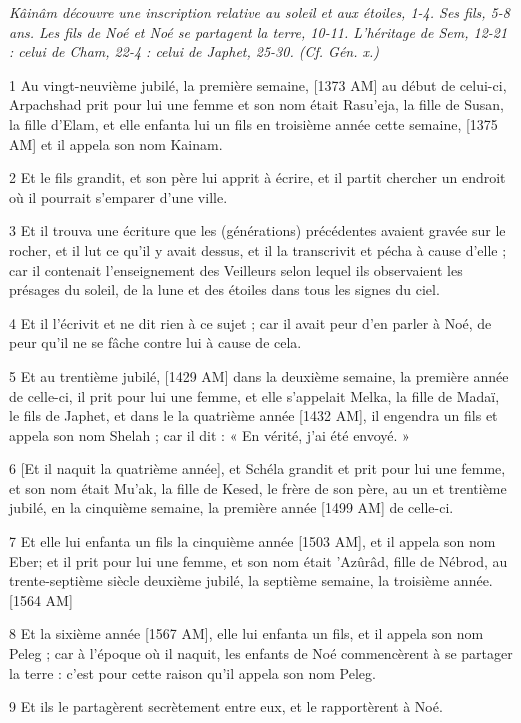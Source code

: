\par \textit{Kâinâm découvre une inscription relative au soleil et aux étoiles, 1-4. Ses fils, 5-8 ans. Les fils de Noé et Noé se partagent la terre, 10-11. L'héritage de Sem, 12-21 : celui de Cham, 22-4 : celui de Japhet, 25-30. (Cf. Gén. x.)}

\par 1 Au vingt-neuvième jubilé, la première semaine, [1373 AM] au début de celui-ci, Arpachshad prit pour lui une femme et son nom était Rasu'eja, la fille de Susan, la fille d'Elam, et elle enfanta lui un fils en troisième année cette semaine, [1375 AM] et il appela son nom Kainam.
\par 2 Et le fils grandit, et son père lui apprit à écrire, et il partit chercher un endroit où il pourrait s'emparer d'une ville.
\par 3 Et il trouva une écriture que les (générations) précédentes avaient gravée sur le rocher, et il lut ce qu'il y avait dessus, et il la transcrivit et pécha à cause d'elle ; car il contenait l'enseignement des Veilleurs selon lequel ils observaient les présages du soleil, de la lune et des étoiles dans tous les signes du ciel.
\par 4 Et il l'écrivit et ne dit rien à ce sujet ; car il avait peur d'en parler à Noé, de peur qu'il ne se fâche contre lui à cause de cela.
\par 5 Et au trentième jubilé, [1429 AM] dans la deuxième semaine, la première année de celle-ci, il prit pour lui une femme, et elle s'appelait Melka, la fille de Madaï, le fils de Japhet, et dans le la quatrième année [1432 AM], il engendra un fils et appela son nom Shelah ; car il dit : « En vérité, j'ai été envoyé. »
\par 6 [Et il naquit la quatrième année], et Schéla grandit et prit pour lui une femme, et son nom était Mu'ak, la fille de Kesed, le frère de son père, au un et trentième jubilé, en la cinquième semaine, la première année [1499 AM] de celle-ci.
\par 7 Et elle lui enfanta un fils la cinquième année [1503 AM], et il appela son nom Eber; et il prit pour lui une femme, et son nom était 'Azûrâd, fille de Nébrod, au trente-septième siècle deuxième jubilé, la septième semaine, la troisième année. [1564 AM]
\par 8 Et la sixième année [1567 AM], elle lui enfanta un fils, et il appela son nom Peleg ; car à l'époque où il naquit, les enfants de Noé commencèrent à se partager la terre : c'est pour cette raison qu'il appela son nom Peleg.
\par 9 Et ils le partagèrent secrètement entre eux, et le rapportèrent à Noé.

